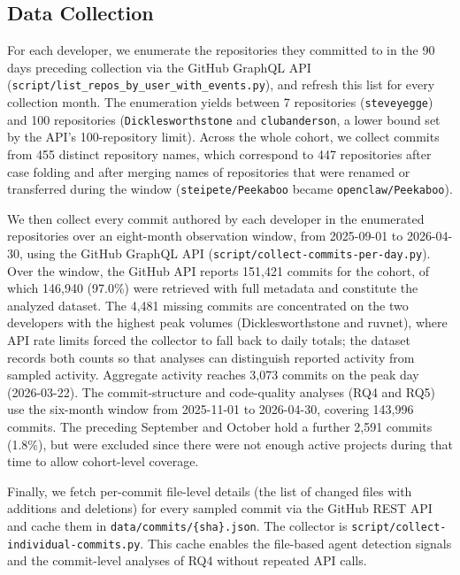 \documentclass[smallextended]{svjour3}
\begin{document}
\subsection{Data Collection}
\label{sec:dataset-collection}

For each developer, we enumerate the repositories they committed to in the 90 days preceding collection via the GitHub GraphQL API (\texttt{script/\allowbreak list\_repos\_by\_}\allowbreak\texttt{user\_with\_events.py}), and refresh this list for every collection month.
The enumeration yields between 7 repositories (\texttt{steveyegge}) and 100 repositories (\texttt{Dicklesworthstone} and \texttt{clubanderson}, a lower bound set by the API's 100-repository limit).
Across the whole cohort, we collect commits from 455 distinct repository names, which correspond to 447 repositories after case folding and after merging names of repositories that were renamed or transferred during the window (\eg \texttt{steipete/Peekaboo} became \texttt{openclaw/Peekaboo}).

We then collect every commit authored by each developer in the enumerated repositories over an eight-month observation window, from 2025-09-01 to 2026-04-30, using the GitHub GraphQL API (\texttt{script/collect-commits-per-day.py}).
Over the window, the GitHub API reports 151,421 commits for the cohort, of which 146,940 (97.0\%) were retrieved with full metadata and constitute the analyzed dataset.
The 4,481 missing commits are concentrated on the two developers with the highest peak volumes (Dicklesworthstone and ruvnet), where API rate limits forced the collector to fall back to daily totals; the dataset records both counts so that analyses can distinguish reported activity from sampled activity.
Aggregate activity reaches 3,073 commits on the peak day (2026-03-22).
The commit-structure and code-quality analyses (RQ4 and RQ5) use the six-month window from 2025-11-01 to 2026-04-30, covering 143,996 commits.
The preceding September and October hold a further 2,591 commits (1.8\%), but were excluded since there were not enough active projects during that time to allow cohort-level coverage.

Finally, we fetch per-commit file-level details (the list of changed files with additions and deletions) for every sampled commit via the GitHub REST API and cache them in \texttt{data/\allowbreak commits/\allowbreak\{sha\}.json}.
The collector is \texttt{script/\allowbreak collect-individual-}\allowbreak\texttt{commits.py}.
This cache enables the file-based agent detection signals and the commit-level analyses of RQ4 without repeated API calls.
\end{document}
